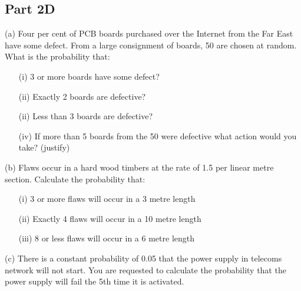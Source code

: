 

\subsection*{Part 2D}


(a)  	Four  per cent of PCB boards purchased over the Internet from the Far East have some defect.  
From a large consignment of boards, 50 are chosen at random.  
What is the probability that:
\begin{itemize}

\item[(i)]  	3 or more boards have some defect?

\item[(ii)]  	Exactly 2 boards are defective?

\item[(ii)]  	Less than 3 boards are defective?

\item[(iv)]  	If more than 5 boards from the 50 were defective what action would you take? (justify)
\end{itemize} 
(b) 	Flaws occur in a hard wood timbers  at the rate of 1.5 per linear  metre section.  Calculate the probability that:
\begin{itemize}

\item[(i)]  	3 or more flaws will occur in a 3  metre length 

\item[(ii)]  	Exactly 4 flaws will occur in a 10 metre length

\item[(iii)]  	8 or less flaws will occur in a 6  metre length 
\end{itemize} 

(c)	There is a constant probability of 0.05  that the power supply in telecoms network will not start.  
You are requested to calculate the probability that the power supply will fail the 5th time it is activated.
